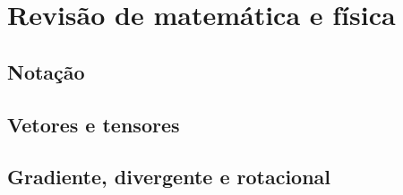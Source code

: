 \chapter{Revisão de matemática e física}\label{ch:rev}

\section{Notação}

\section{Vetores e tensores}

\section{Gradiente, divergente e rotacional}
